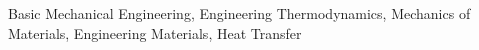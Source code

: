 

\begin{cvparagraph}

\textcolor{russell}{Basic Mechanical Engineering, Engineering Thermodynamics, Mechanics of Materials, Engineering Materials, Heat Transfer}
\end{cvparagraph}